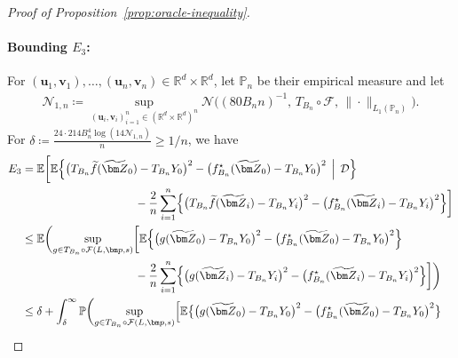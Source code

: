 \documentclass[12pt]{article}
\newcommand{\blue}[1]{\textcolor{blue}{#1}}
\def\tilde{\widetilde}
\begin{document}
\begin{proof}[Proof of Proposition~\ref{prop:oracle-inequality}]
    \paragraph{Bounding $E_3$:}
    For $(\bm u_1,\bm v_1),\ldots,(\bm u_n,\bm v_n) \in \mathbb{R}^d\times\mathbb{R}^d$, let $\mathbb{P}_n$ be their empirical measure and let 
    \begin{align*}
        \mathcal{N}_{1,n} \coloneqq \sup_{(\bm u_i,\bm v_i)_{i=1}^n \in (\mathbb{R}^d\times\mathbb{R}^d)^n} \mathcal{N}\bigl((80B_n n)^{-1},\, T_{B_n}\circ\mathcal{F},\, \|\cdot\|_{L_1(\mathbb{P}_n)}\bigr).
    \end{align*}
    For $\delta \coloneqq \frac{24\cdot214 B_n^4 \log(14\mathcal{N}_{1,n})}{n} \geq 1/n$, we have
    \begin{align}
        E_3 &= \mathbb{E}\biggl[ \mathbb{E}\Bigl\{ \bigl(T_{B_n}\tilde{f}(\tilde{\bm Z}_0) - T_{B_n}Y_0\bigr)^2 - \bigl(f^{\star}_{B_n}(\tilde{\bm Z}_0) - T_{B_n}Y_0\bigr)^2 \,\Bigm|\, \mathcal{D} \Bigr\}\nonumber\\
        &\hspace{3.5cm} -\frac{2}{n} \sum_{i=1}^n \Bigl\{ \bigl(T_{B_n}\tilde{f}(\tilde{\bm Z}_i) - T_{B_n}Y_i\bigr)^2 - \bigl(f^{\star}_{B_n}(\tilde{\bm Z}_i) - T_{B_n}Y_i\bigr)^2 \Bigr\}\biggr]\nonumber\\
        &\leq \mathbb{E}\biggl( \sup_{g\in T_{B_n} \circ \mathcal{F}(L,\bm p,s)}  \biggl[ \mathbb{E}\Bigl\{ \bigl(g(\tilde{\bm Z}_0) - T_{B_n}Y_0\bigr)^2 - \bigl(f^{\star}_{B_n}(\tilde{\bm Z}_0) - T_{B_n}Y_0\bigr)^2  \Bigr\}\nonumber\\
        &\hspace{3.5cm} -\frac{2}{n} \sum_{i=1}^n \Bigl\{ \bigl(g(\tilde{\bm Z}_i) - T_{B_n}Y_i\bigr)^2 - \bigl(f^{\star}_{B_n}(\tilde{\bm Z}_i) - T_{B_n}Y_i\bigr)^2 \Bigr\} \biggr] \biggr) \nonumber\\
        &\leq \delta + \int_{\delta}^{\infty} \mathbb{P}\biggl( \sup_{g\in T_{B_n} \circ \mathcal{F}(L,\bm p,s)} \Bigl[ \mathbb{E}\bigl\{\bigl(g(\tilde{\bm Z}_0) - T_{B_n}Y_0\bigr)^2 - \bigl(f^{\star}_{B_n}(\tilde{\bm Z}_0) - T_{B_n}Y_0\bigr)^2\bigr\} \nonumber\\

\end{align}
\end{proof}
\end{document}
